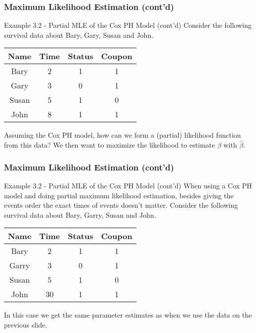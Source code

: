 \documentclass{beamer}
\theoremstyle{definition}
\begin{document}
\begin{frame}
\frametitle{Maximum Likelihood Estimation (cont'd)}
\begin{block}{Example 3.2 - Partial MLE of the Cox PH Model (cont'd)}
Consider the following survival data about Bary, Gary, Susan and John.
\begin{center}
\begin{tabular}{ c c c c } \hline
 Name & Time & Status & Coupon \\ \hline
Bary & 2 & 1 & 1 \\
 Gary & 3 & 0 & 1 \\
Susan & 5 & 1 & 0 \\
  John & 8 & 1 & 1 \\
\end{tabular}
\end{center}
\end{block}
Assuming the Cox PH model, how can we form a (partial) likelihood function from this data? We then want to maximize the likelihood to estimate $\beta$ with $\hat{\beta}$.
\end{frame}


\begin{frame}
\frametitle{Maximum Likelihood Estimation (cont'd)}
\begin{block}{Example 3.2 - Partial MLE of the Cox PH Model (cont'd)}
When using a Cox PH model and doing partial maximum likelihood estimation, besides giving the events order the exact times of events doesn't matter. Consider the following survival data about Bary, Garry, Susan and John.
\begin{center}
\begin{tabular}{ c c c c } \hline
 Name & Time & Status & Coupon \\ \hline
Bary & 2 & 1 & 1 \\
 Garry & 3 & 0 & 1 \\
Susan & 5 & 1 & 0 \\
  John & 30 & 1 & 1 \\
\end{tabular}
\end{center}
\end{block}
In this case we get the same parameter estimates as when we use the data on the previous slide.
\end{frame}
\end{document}
